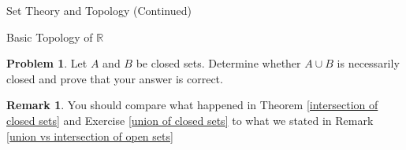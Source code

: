 \documentclass[11pt]{article}
\theoremstyle{definition}
\newtheorem{problem}[theorem]{Problem}
\newtheorem{remark}[theorem]{Remark}
\begin{document}
\begin{section}{Set Theory and Topology (Continued)}
\begin{subsection}{Basic Topology of $\mathbb{R}$}
\begin{problem}
Let $A$ and $B$ be closed sets.  Determine whether $A\cup B$ is necessarily closed and prove that your answer is correct.
\end{problem}

\begin{remark}
You should compare what happened in Theorem \ref{intersection of closed sets} and Exercise \ref{union of closed sets} to what we stated in Remark \ref{union vs intersection of open sets}
\end{remark}

\end{subsection}

\end{section}
\end{document}
